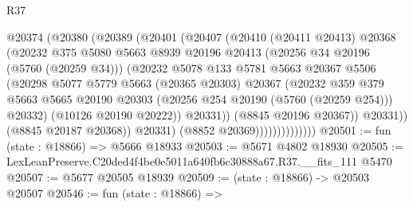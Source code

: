 \begin{lexlean}{R37}
\begin{coremodule}
                            @20374
                              (@20380
                                (@20389
                                  (@20401
                                    (@20407
                                      (@20410
                                        (@20411 @20413)
                                        @20368
                                        (@20232
                                          @375
                                          @5080
                                          @5663
                                          @8939
                                          @20196
                                          @20413
                                          (@20256 @34 @20196 (@5760 (@20259 @34)))
                                          (@20232
                                            @5078
                                            @133
                                            @5781
                                            @5663
                                            @20367
                                            @5506
                                            (@20298
                                              @5077
                                              @5779
                                              @5663
                                              (@20365 @20303)
                                              @20367
                                              (@20232
                                                @359
                                                @379
                                                @5663
                                                @5665
                                                @20190
                                                @20303
                                                (@20256 @254 @20190 (@5760 (@20259 @254)))
                                                @20332)
                                              (@10126 @20190 @20222))
                                            @20331))
                                        (@8845 @20196 @20367))
                                      @20331))
                                  (@8845 @20187 @20368))
                                @20331)
                              (@8852 @20369))))))))))))))
@20501 := fun (state : @18866) => @5666 @18933
@20503 := @5671 @4802 @18930
@20505 := LexLeanPreserve.C20ded4f4be0e5011a640fb6c30888a67.R37.__fits_111 @5470
@20507 := @5677 @20505 @18939
@20509 := (state : @18866) -> @20503 @20507
@20546 := fun (state : @18866) =>

\end{coremodule}
\end{lexlean}
